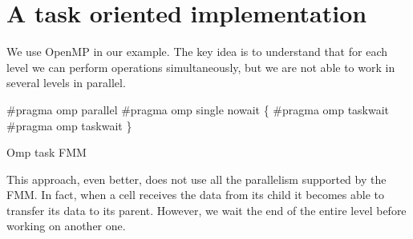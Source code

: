 \documentclass[12pt,letterpaper,titlepage]{report}
\begin{document}
\section{A task oriented implementation}
We use OpenMP in our example.
The key idea is to understand that for each level we can perform operations simultaneously, but we are not able to work in several levels in parallel.
\BlankLine
\begin{algorithm}[H]
\linesnumbered
\SetLine
\BlankLine
\#pragma omp parallel \linebreak
\#pragma omp single nowait \linebreak
\{ \linebreak
        \BlankLine
        \#pragma omp taskwait \linebreak
        \#pragma omp taskwait \linebreak
\} \linebreak
\BlankLine
\caption{Omp task FMM}
\end{algorithm}
\BlankLine
This approach, even better, does not use all the parallelism supported by the FMM.
In fact, when a cell receives the data from its child it becomes able to transfer its data to its parent. However, we wait the end of the entire level before working on another one.
\end{document}
